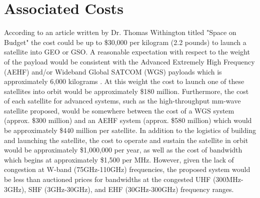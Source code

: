 \documentclass[conference]{IEEEtran}
\begin{document}
\section{Associated Costs}
According to an article written by Dr. Thomas Withington titled "Space on Budget" the cost could be up to \$30,000 per kilogram (2.2 pounds) to launch a satellite into GEO or GSO. A reasonable expectation with respect to the weight of the payload would be consistent with the Advanced Extremely High Frequency (AEHF) and/or Wideband Global SATCOM (WGS) payloads which is approximately 6,000 kilograms \cite{b6} \cite{b7}. At this weight the cost to launch one of these satellites into orbit would be approximately \$180 million. Furthermore, the cost of each satellite for advanced systems, such as the high-throughput mm-wave satellite proposed, would be somewhere between the cost of a WGS system (approx. \$300 million)\cite{b6} and an AEHF system (approx. \$580 million)\cite{b7} which would be approximately \$440 million per satellite. In addition to the logistics of building and launching the satellite, the cost to operate and sustain the satellite in orbit would be approximately \$1,000,000 per year, as well as the cost of bandwidth which begins at approximately \$1,500 per MHz. However, given the lack of congestion at W-band (75GHz-110GHz) frequencies, the proposed system would be less than auctioned prices for bandwidths at the congested UHF (300MHz-3GHz), SHF (3GHz-30GHz), and EHF (30GHz-300GHz) frequency ranges.  
\end{document}
